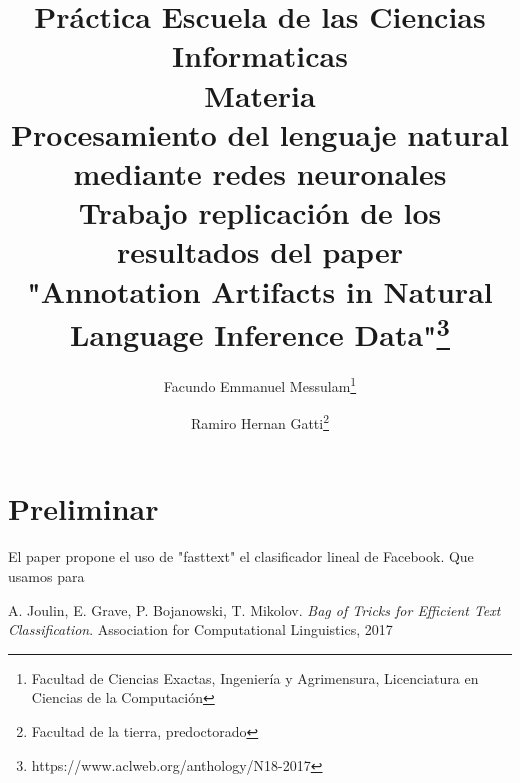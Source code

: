 \documentclass{article}
\title{Práctica Escuela de las Ciencias Informaticas\\
	{\small{Materia}}\\
	Procesamiento del lenguaje natural mediante redes neuronales\\
	{\small{Trabajo replicación de los resultados del paper}}\\
	"Annotation Artifacts in Natural Language Inference Data"\footnote{https://www.aclweb.org/anthology/N18-2017}}
\author{Facundo Emmanuel Messulam\footnote{Facultad de Ciencias Exactas, Ingeniería y Agrimensura, Licenciatura en Ciencias de la Computación}
	\and
	Ramiro Hernan Gatti\footnote{Facultad de la tierra, predoctorado}}
\begin{document}
    \begin{titlepage}
        \maketitle
        \thispagestyle{empty}
    \end{titlepage}
	
	\section*{Preliminar}
	El paper propone el uso de "fasttext" el clasificador lineal de Facebook\cite{joulin2017bag}. Que usamos para
	
	\newpage
	\begin{thebibliography}{9}
		A. Joulin, E. Grave, P. Bojanowski, T. Mikolov. \textit{Bag of Tricks for Efficient Text Classification}. Association for Computational Linguistics, 2017
	\end{thebibliography}
\end{document}
